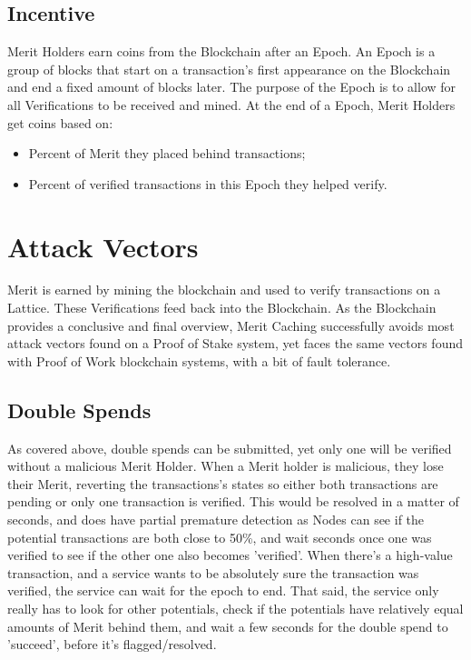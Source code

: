 \documentclass[14pt]{article}
\begin{document}
\newpage

\label{sec:2.3}
\subsection{Incentive}
Merit Holders earn coins from the Blockchain after an Epoch. An Epoch is a group of blocks that start on a transaction’s first appearance on the Blockchain and end a fixed amount of blocks later. The purpose of the Epoch is to allow for all Verifications to be received and mined. At the end of a Epoch, Merit Holders get coins based on:
\begin{itemize}
\item Percent of Merit they placed behind transactions;
\item Percent of verified transactions in this Epoch they helped verify.
\end{itemize}

\newpage

\label{sec:3}
\section{Attack Vectors}
Merit is earned by mining the blockchain and used to verify transactions on a Lattice. These Verifications feed back into the Blockchain. As the Blockchain provides a conclusive and final overview, Merit Caching successfully avoids most attack vectors found on a Proof of Stake system, yet faces the same vectors found with Proof of Work blockchain systems, with a bit of fault tolerance.

\label{sec:3.1}
\subsection{Double Spends}
As covered above, double spends can be submitted, yet only one will be verified without a malicious Merit Holder. When a Merit holder is malicious, they lose their Merit, reverting the transactions's states so either both transactions are pending or only one transaction is verified. This would be resolved in a matter of seconds, and does have partial premature detection as Nodes can see if the potential transactions are both close to 50\%, and wait seconds once one was verified to see if the other one also becomes 'verified'. When there's a high-value transaction, and a service wants to be absolutely sure the transaction was verified, the service can wait for the epoch to end. That said, the service only really has to look for other potentials, check if the potentials have relatively equal amounts of Merit behind them, and wait a few seconds for the double spend to 'succeed', before it's flagged/resolved.
\end{document}

